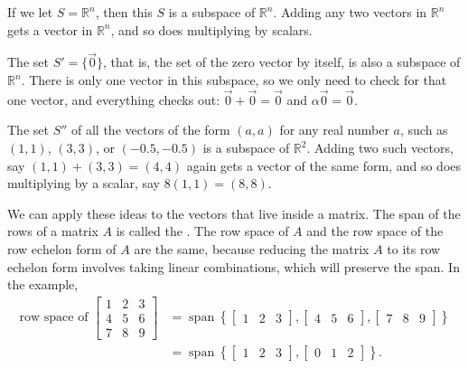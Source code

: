 \documentclass{ximera}
\begin{document}
\begin{example} \label{example:simplesubspaces} 
    If we let $S = {\mathbb R}^n$, then this $S$ is a subspace of ${\mathbb R}^n$.  Adding any two vectors in ${\mathbb R}^n$ gets a vector in ${\mathbb R}^n$, and so does multiplying by scalars.
    
    The set $S' = \{ \vec{0} \}$, that is, the set of the zero vector by itself, is  also a subspace of ${\mathbb R}^n$.  There is only one vector in this subspace, so we only need to check for that one vector, and everything checks out: $\vec{0}+\vec{0} = \vec{0}$ and $\alpha \vec{0} = \vec{0}$.
    
    The set $S''$ of all the vectors of the form $(a,a)$ for any real number $a$, such as $(1,1)$, $(3,3)$, or $(-0.5,-0.5)$ is a subspace of ${\mathbb R}^2$.  Adding two such vectors, say $(1,1)+(3,3) = (4,4)$ again gets a vector of the same form, and so does multiplying by a scalar, say $8(1,1) = (8,8)$.
\end{example}

We can apply these ideas to the vectors that live inside a matrix. The span of the rows of a matrix $A$ is called the \emph{}. The row space of $A$ and the row space of the row echelon form of $A$ are the same, because reducing the matrix $A$ to its row echelon form involves taking linear combinations, which will preserve the span. In the example,
\begin{equation*}
    \begin{split}
        \text{row space of }
        \begin{bmatrix}
            1 & 2 & 3 \\
            4 & 5 & 6 \\
            7 & 8 & 9
        \end{bmatrix}
        & =
        \operatorname{span}
        \left\{
            \begin{bmatrix}
                1 & 2 & 3
            \end{bmatrix}
            ,
            \begin{bmatrix}
                4 & 5 & 6
            \end{bmatrix}
            ,
            \begin{bmatrix}
                7 & 8 & 9
            \end{bmatrix}
        \right\} \\
        & =
        \operatorname{span}
        \left\{
            \begin{bmatrix}
                1 & 2 & 3
            \end{bmatrix}
            ,
            \begin{bmatrix}
                0 & 1 & 2
            \end{bmatrix}
        \right\} .
    \end{split}
\end{equation*}
\end{document}

